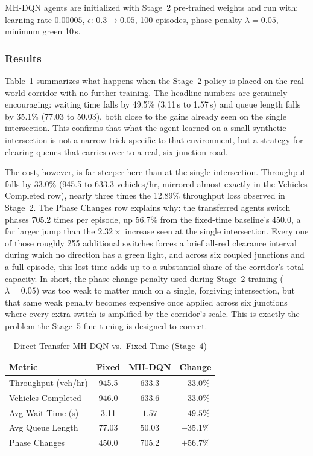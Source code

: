 \documentclass[lettersize,journal]{IEEEtran}
\begin{document}
MH-DQN agents are initialized with Stage~2 pre-trained weights and run
with: learning rate $0.00005$, $\epsilon$: $0.3\!\to\!0.05$, 100 episodes,
phase penalty $\lambda=0.05$, minimum green 10\,s.

\subsubsection{Results}

Table~\ref{tab:results_hab4} summarizes what happens when the Stage~2
policy is placed on the real-world corridor with no further training. The
headline numbers are genuinely encouraging: waiting time falls by 49.5\%
(3.11\,s to 1.57\,s) and queue length falls by 35.1\% (77.03 to 50.03),
both close to the gains already seen on the single intersection. This
confirms that what the agent learned on a small synthetic intersection is
not a narrow trick specific to that environment, but a strategy for
clearing queues that carries over to a real, six-junction road.

The cost, however, is far steeper here than at the single intersection.
Throughput falls by 33.0\% (945.5 to 633.3 vehicles/hr, mirrored almost
exactly in the Vehicles Completed row), nearly three times the 12.89\%
throughput loss observed in Stage~2. The Phase Changes row explains why:
the transferred agents switch phases 705.2 times per episode, up 56.7\%
from the fixed-time baseline's 450.0, a far larger jump than the
$2.32\times$ increase seen at the single intersection. Every one of those
roughly 255 additional switches forces a brief all-red clearance interval
during which no direction has a green light, and across six coupled
junctions and a full episode, this lost time adds up to a substantial
share of the corridor's total capacity. In short, the phase-change penalty
used during Stage~2 training ($\lambda=0.05$) was too weak to matter much
on a single, forgiving intersection, but that same weak penalty becomes
expensive once applied across six junctions where every extra switch is
amplified by the corridor's scale. This is exactly the problem the
Stage~5 fine-tuning is designed to correct.

\begin{table}[!t]
\caption{Direct Transfer MH-DQN vs.\ Fixed-Time
         (Stage~4)\label{tab:results_hab4}}
\centering
\renewcommand{\arraystretch}{1.2}
\begin{tabular}{@{}lccc@{}}
\toprule
\textbf{Metric} & \textbf{Fixed} & \textbf{MH-DQN} & \textbf{Change} \\
\midrule
Throughput (veh/hr) & 945.5 & 633.3            & $-33.0\%$ \\
Vehicles Completed  & 946.0 & 633.6            & $-33.0\%$ \\
Avg Wait Time (s)   & 3.11  & $\mathbf{1.57}$  & $\mathbf{-49.5\%}$ \\
Avg Queue Length    & 77.03 & $\mathbf{50.03}$ & $\mathbf{-35.1\%}$ \\
Phase Changes       & 450.0 & 705.2            & $+56.7\%$ \\
\bottomrule
\end{tabular}
\end{table}
\end{document}
